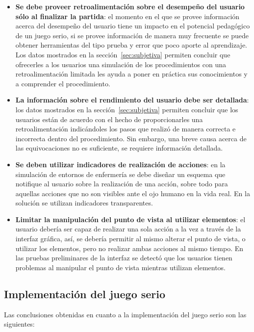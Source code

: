 \begin{itemize}
\item \textbf{Se debe proveer retroalimentación sobre el desempeño del usuario sólo al finalizar la partida}: el momento en el que se provee información acerca del desempeño del usuario tiene un impacto en el potencial pedagógico de un juego serio, si se provee información de manera muy frecuente se puede obtener herramientas del tipo prueba y error que poco aporte al aprendizaje. Los datos mostrados en la sección~\ref{sec:subjetiva} permiten concluir que ofrecerles a los usuarios una simulación de los procedimientos con una retroalimentación limitada les ayuda a poner en práctica sus conocimientos y a comprender el procedimiento. 

\item \textbf{La información sobre el rendimiento del usuario debe ser detallada}: los datos mostrados en la sección~\ref{sec:subjetiva} permiten concluir que los usuarios están de acuerdo con el hecho de proporcionarles una retroalimentación indicándoles los pasos que realizó de manera correcta e incorrecta dentro del procedimiento. Sin embargo, una breve causa acerca de las equivocaciones no es suficiente, se requiere información detallada. 
    
\item \textbf{Se deben utilizar indicadores de realización de acciones}: en la simulación de entornos de enfermería se debe diseñar un esquema que notifique al usuario sobre la realización de una acción, sobre todo para  aquellas acciones que no son visibles ante el ojo humano en la vida real.  En la solución se utilizan indicadores transparentes.

\item \textbf{Limitar la manipulación del punto de vista al utilizar elementos}: el usuario debería ser capaz de realizar una sola acción a la vez a través de la interfaz gráfica, así, se debería permitir al mismo alterar el punto de vista, o utilizar los elementos, pero no realizar ambas acciones al mismo tiempo. En las pruebas preliminares de la interfaz se detectó que los usuarios tienen problemas al manipular el punto de vista mientras utilizan elementos.

\end{itemize}

\subsection{Implementación del juego serio}

Las conclusiones obtenidas en cuanto a la implementación del juego serio son las  siguientes:

